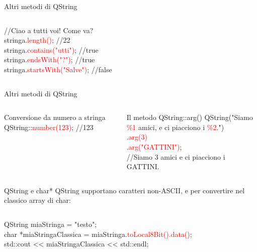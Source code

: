 \documentclass[10pt, aspectratio=169]{beamer}
\begin{document}
\begin{frame}{Altri metodi di QString}
	\begin{columns}
		\begin{block}{}
			{\ttfamily //Ciao a tutti voi! Come va?\\
				\bigskip
				stringa.\textcolor{red}{length()}; //22\\
				\bigskip
				stringa.\textcolor{red}{contains("utti")}; //true\\
				\bigskip
				stringa.\textcolor{red}{endsWith("?")}; //true\\
				\bigskip
				stringa.\textcolor{red}{startsWith("Salve")}; //false}
		\end{block}
	\end{columns}
\end{frame}

\begin{frame}{Altri metodi di QString}
	\begin{columns}
		\column{0.8\textwidth}
		\begin{block}{Conversione da numero a stringa}
			{\ttfamily QString::\textcolor{red}{number(123)};  //123}
		\end{block}
		\bigskip

		\begin{block}{Il metodo QString::arg()}
			{\ttfamily QString("Siamo \textcolor{red}{\%1} amici, e ci piacciono i \textcolor{red}{\%2}.")\\
				.\textcolor{red}{arg(3)}\\
				.\textcolor{red}{arg("GATTINI")};\\
				//Siamo 3 amici e ci piacciono i GATTINI.}
		\end{block}
	\end{columns}
\end{frame}

\begin{frame}{QString e char*}
	QString supportano caratteri non-ASCII, e per convertire nel classico array di char:
	\begin{columns}
		\column{0.75\textwidth}
		\begin{block}{}
			{\ttfamily QString miaStringa = "testo";\\
				char *miaStringaClassica = miaStringa.\textcolor{red}{toLocal8Bit().data()};\\
				std::cout << miaStringaClassica << std::endl;}
		\end{block}
	\end{columns}
\end{frame}
\end{document}
